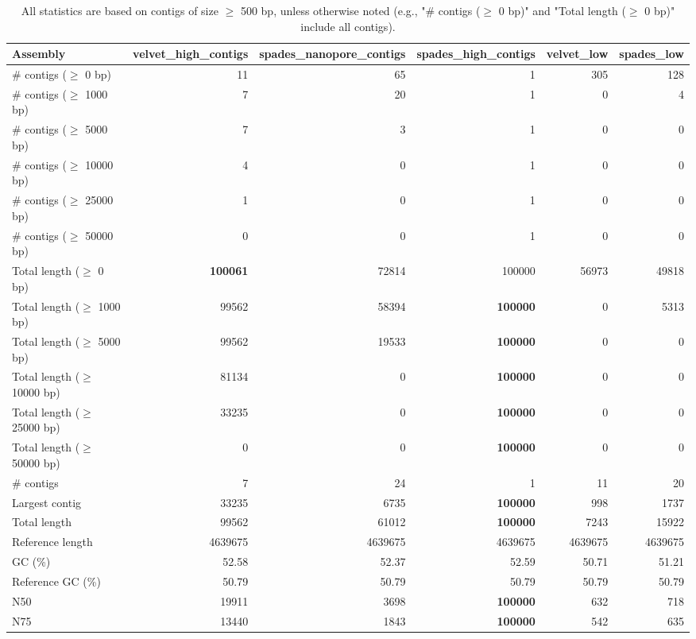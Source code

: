 \documentclass[12pt,a4paper]{article}
\begin{document}
\begin{table}[ht]
\begin{center}
\caption{All statistics are based on contigs of size $\geq$ 500 bp, unless otherwise noted (e.g., "\# contigs ($\geq$ 0 bp)" and "Total length ($\geq$ 0 bp)" include all contigs).}
\begin{tabular}{|l*{5}{|r}|}
\hline
Assembly & velvet\_high\_contigs & spades\_nanopore\_contigs & spades\_high\_contigs & velvet\_low & spades\_low \\ \hline
\# contigs ($\geq$ 0 bp) & 11 & 65 & 1 & 305 & 128 \\ \hline
\# contigs ($\geq$ 1000 bp) & 7 & 20 & 1 & 0 & 4 \\ \hline
\# contigs ($\geq$ 5000 bp) & 7 & 3 & 1 & 0 & 0 \\ \hline
\# contigs ($\geq$ 10000 bp) & 4 & 0 & 1 & 0 & 0 \\ \hline
\# contigs ($\geq$ 25000 bp) & 1 & 0 & 1 & 0 & 0 \\ \hline
\# contigs ($\geq$ 50000 bp) & 0 & 0 & 1 & 0 & 0 \\ \hline
Total length ($\geq$ 0 bp) & {\bf 100061} & 72814 & 100000 & 56973 & 49818 \\ \hline
Total length ($\geq$ 1000 bp) & 99562 & 58394 & {\bf 100000} & 0 & 5313 \\ \hline
Total length ($\geq$ 5000 bp) & 99562 & 19533 & {\bf 100000} & 0 & 0 \\ \hline
Total length ($\geq$ 10000 bp) & 81134 & 0 & {\bf 100000} & 0 & 0 \\ \hline
Total length ($\geq$ 25000 bp) & 33235 & 0 & {\bf 100000} & 0 & 0 \\ \hline
Total length ($\geq$ 50000 bp) & 0 & 0 & {\bf 100000} & 0 & 0 \\ \hline
\# contigs & 7 & 24 & 1 & 11 & 20 \\ \hline
Largest contig & 33235 & 6735 & {\bf 100000} & 998 & 1737 \\ \hline
Total length & 99562 & 61012 & {\bf 100000} & 7243 & 15922 \\ \hline
Reference length & 4639675 & 4639675 & 4639675 & 4639675 & 4639675 \\ \hline
GC (\%) & 52.58 & 52.37 & 52.59 & 50.71 & 51.21 \\ \hline
Reference GC (\%) & 50.79 & 50.79 & 50.79 & 50.79 & 50.79 \\ \hline
N50 & 19911 & 3698 & {\bf 100000} & 632 & 718 \\ \hline
N75 & 13440 & 1843 & {\bf 100000} & 542 & 635 \\ \hline

\end{tabular}
\end{center}
\end{table}
\end{document}

